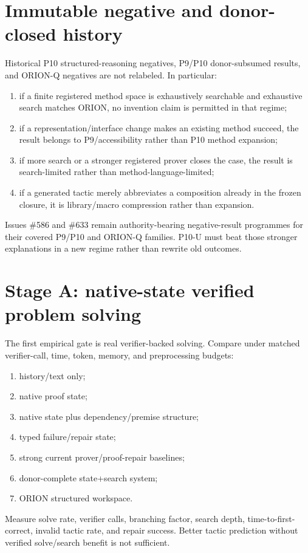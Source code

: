 \documentclass[11pt]{article}
\begin{document}
\section{Immutable negative and donor-closed history}
Historical P10 structured-reasoning negatives, P9/P10 donor-subsumed results, and ORION-Q negatives are not relabeled. In particular:
\begin{enumerate}
    \item if a finite registered method space is exhaustively searchable and exhaustive search matches ORION, no invention claim is permitted in that regime;
    \item if a representation/interface change makes an existing method succeed, the result belongs to P9/accessibility rather than P10 method expansion;
    \item if more search or a stronger registered prover closes the case, the result is search-limited rather than method-language-limited;
    \item if a generated tactic merely abbreviates a composition already in the frozen closure, it is library/macro compression rather than expansion.
\end{enumerate}
Issues \#586 and \#633 remain authority-bearing negative-result programmes for their covered P9/P10 and ORION-Q families. P10-U must beat those stronger explanations in a new regime rather than rewrite old outcomes.

\section{Stage A: native-state verified problem solving}
The first empirical gate is real verifier-backed solving. Compare under matched verifier-call, time, token, memory, and preprocessing budgets:
\begin{enumerate}
    \item history/text only;
    \item native proof state;
    \item native state plus dependency/premise structure;
    \item typed failure/repair state;
    \item strong current prover/proof-repair baselines;
    \item donor-complete state+search system;
    \item ORION structured workspace.
\end{enumerate}
Measure solve rate, verifier calls, branching factor, search depth, time-to-first-correct, invalid tactic rate, and repair success. Better tactic prediction without verified solve/search benefit is not sufficient.
\end{document}

